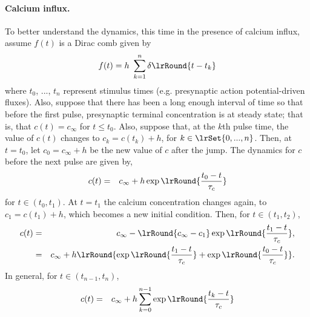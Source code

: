 \paragraph{Calcium influx. }
To better understand the {\calcium} dynamics, this time in the presence of calcium influx, 
assume $f(t)$ is a Dirac comb given by 
\begin{equation}
f(t) =  h ~\sum_{k=1}^{n} \delta\lrRound{t-t_{k}}
\end{equation}
where $t_{0}$, ..., $t_{n}$ represent stimulus times (e.g. presynaptic action potential-driven fluxes).  Also, suppose that there has been a long enough interval of time so that before the first pulse, presynaptic terminal {\calcium} concentration is at steady state; that is, that $c(t)=c_{\infty}$ for $t\leq t_{0}$. Also, suppose that, at the $k$th pulse time, the value of $c(t)$ changes to $c_{k}= c(t_{k})+ h$, for $k \in \lrSet{0,...,n}$. 
Then, at $t=t_{0}$, let $c_{0} = c_{\infty} + h$ be the new value of $c$ after the jump. The dynamics for $c$ before the next pulse are given by, 
\begin{eqnarray*} 
c(t) %
&=& 
c_{\infty} + h\exp\lrRound{ \frac{t_{0}-t}{\tau_{c}}}
\end{eqnarray*} 
for $t \in (t_{0},t_{1})$. At $t=t_{1}$ the calcium concentration changes again, to $c_{1}= c(t_{1})+ h$, which becomes a new initial condition. Then, for $t \in (t_{1},t_{2})$, 
\begin{eqnarray*} 
c(t) &=& c_{\infty} - \lrRound{c_{\infty}-c_{1}}\exp\lrRound{ \frac{t_{1}-t}{\tau_{c}}},
\\ 
&=& c_{\infty} + h\lrRound{  \exp\lrRound{ \frac{t_{1}-t}{\tau_{c}}} + \exp\lrRound{ \frac{t_{0}-t}{\tau_{c}}}}.
 \end{eqnarray*} 
In general, for $t \in (t_{n-1},t_{n})$,
 \begin{eqnarray*} 
c(t) &=&  c_{\infty} +h \sum_{k=0}^{n-1} \exp\lrRound{ \frac{t_{k}-t}{\tau_{c}}}
 \end{eqnarray*} 
